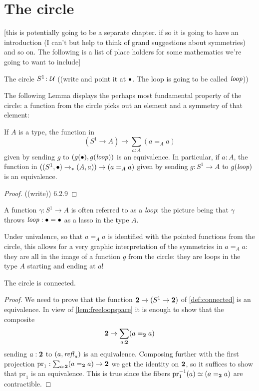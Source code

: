 \section{The circle}
\label{sec:sec:circle}
[this is potentially going to be a separate chapter.  if so it is going to have an introduction (I can't but help to think of grand suggestions about symmetries) and so on.  The following is a list of place holders for some mathematics we're going to want to include]

\begin{definition}
  \label{def:circle}
The circle $S^1\colon\mathcal{U}$ ((write and point it at $\bullet$.  The loop is going to be called $\mathit{loop}$))
\end{definition}
The following Lemma displays the perhaps most fundamental property of the circle: a function from the circle picks out an element and a symmetry of that element:
\begin{lemma}\label{lem:freeloopspace}
  If $A$ is a type, the function in $$(S^1\to A)\to \sum_{a:A}(a=_Aa)$$
given by sending $g$ to $(g(\bullet),g(\mathit{loop}))$ is an equivalence.  In particular, if $a:A$, the function in $((S^1,\bullet)\to_* (A,a))\to (a=_Aa)$ given by sending $g:S^1\to A$ to $g(\mathit{loop})$ is an equivalence. 
\end{lemma}
\begin{proof}
  ((write)) 6.2.9
\end{proof}
\begin{remark}
  A function $\gamma:S^1\to A$ is often referred to as a \emph{loop}: the picture being that $\gamma$ throws $\mathit{loop}:\bullet=\bullet$ as a lasso in the type $A$.

  Under univalence, so that $a=_Aa$ is identified with the pointed functions from the circle, this allows for a very graphic interpretation of the symmetries in $a=_Aa$: they are all in the image of a function $g$ from the circle: they are loops in the type $A$ starting and ending at $a$!
\end{remark}



\begin{lemma}\label{lem:circleisconnected}
  The circle is connected.
\end{lemma}
\begin{proof}
  We need to prove that the function $\mathbf{2} \to(S^1\to\mathbf{2} )$ of \cref{def:connected} is an equivalence.  In view of \cref{lem:freeloopspace} it is enough to show that the composite
$$\mathbf{2} \to \sum_{a:\mathbf{2} }(a=_{\mathbf{2} }a)$$
sending $a:\mathbf{2} $ to $(a,\mathop{{\it refl}_{a}})$ is an equivalence.  Composing further with the first  projection $\mathrm{pr}_1:\sum_{a:\mathbf{2} }(a=_{\mathbf{2} }a)\to\mathbf{2}$ we get the identity on $\mathbf{2}$, so it suffices to show that $\mathrm{pr}_1$ is an equivalence.  This is true since the fibers $\mathrm{pr}_1^{-1}(a)\simeq (a=_{\mathbf{2} }a)$ are contractible.
\end{proof}


